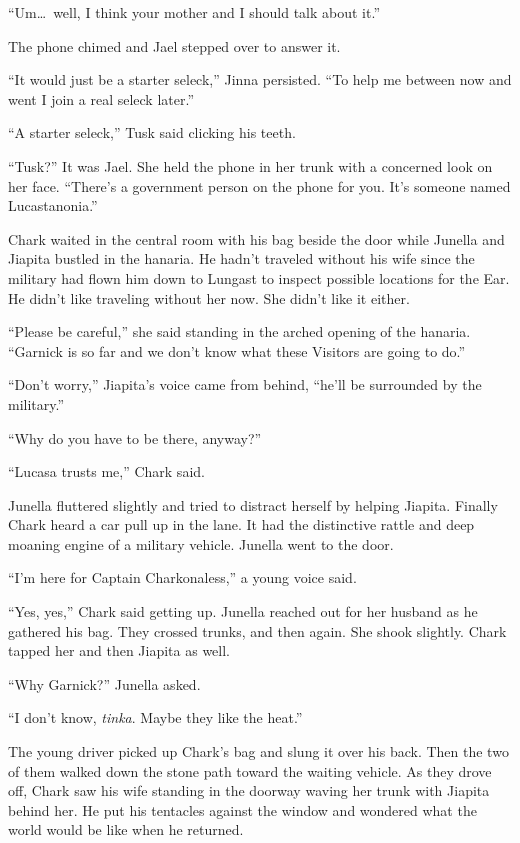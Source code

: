 ``Um\ldots\ well, I think your mother and I should talk about it.''

The phone chimed and Jael stepped over to answer it.

``It would just be a starter seleck,'' Jinna persisted. ``To help me between now and went I join
a real seleck later.''

``A starter seleck,'' Tusk said clicking his teeth.

``Tusk?'' It was Jael. She held the phone in her trunk with a concerned look on her face.
``There's a government person on the phone for you. It's someone named Lucastanonia.''

\spacebreak

Chark waited in the central room with his bag beside the door while Junella and Jiapita bustled
in the hanaria. He hadn't traveled without his wife since the military had flown him down to
Lungast to inspect possible locations for the Ear. He didn't like traveling without her now. She
didn't like it either.

``Please be careful,'' she said standing in the arched opening of the hanaria. ``Garnick is so
far and we don't know what these Visitors are going to do.''

``Don't worry,'' Jiapita's voice came from behind, ``he'll be surrounded by the military.''

``Why do you have to be there, anyway?''

``Lucasa trusts me,'' Chark said.

Junella fluttered slightly and tried to distract herself by helping Jiapita. Finally Chark heard
a car pull up in the lane. It had the distinctive rattle and deep moaning engine of a military
vehicle. Junella went to the door.

``I'm here for Captain Charkonaless,'' a young voice said.

``Yes, yes,'' Chark said getting up. Junella reached out for her husband as he gathered his bag.
They crossed trunks, and then again. She shook slightly. Chark tapped her and then Jiapita as
well.

``Why Garnick?'' Junella asked.

``I don't know, \textit{tinka}. Maybe they like the heat.''

The young driver picked up Chark's bag and slung it over his back. Then the two of them walked
down the stone path toward the waiting vehicle. As they drove off, Chark saw his wife standing
in the doorway waving her trunk with Jiapita behind her. He put his tentacles against the window
and wondered what the world would be like when he returned.

